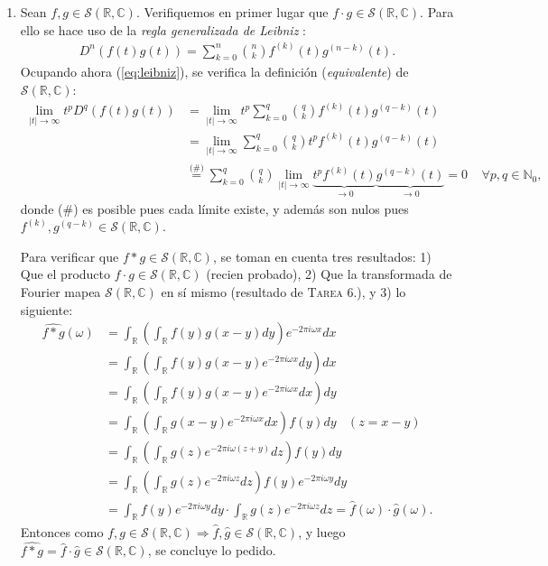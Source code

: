 \documentclass[spanish, fleqn]{article}
\begin{document}
\begin{description}
\begin{enumerate}
		\item Sean $f,g  \in \mathcal{S}(\mathbb{R},\mathbb{C})$. Verifiquemos en primer lugar que $f\cdot g \in \mathcal{S}(\mathbb{R},\mathbb{C})$. Para ello se hace uso de la \textit{regla generalizada de Leibniz} \cite{Leibniz}:
		\begin{align}
			D^n \left(f(t)g(t) \right) = \sum_{k=0}^n {n \choose k} f^{(k)}(t) g^{(n-k)}(t).
		\label{eq:leibniz}
		\end{align}
		Ocupando ahora (\ref{eq:leibniz}), se verifica la definición (\textit{equivalente}) de $\mathcal{S}(\mathbb{R},\mathbb{C})$:
		\begin{align*}
			\lim_{|t|\rightarrow \infty} t^p D^q \left( f(t)g(t) \right)
			&= \lim_{|t|\rightarrow \infty} t^p \sum_{k=0}^q {q \choose k} f^{(k)}(t) g^{(q-k)}(t) \\
			&= \lim_{|t|\rightarrow \infty} \sum_{k=0}^q {q \choose k} t^p f^{(k)}(t) g^{(q-k)}(t) \\
			&\stackrel{\text{(\#)}}{=} \sum_{k=0}^q {q \choose k}\lim_{|t|\rightarrow \infty}  \underbrace{t^p f^{(k)}(t)}_{\rightarrow 0} \underbrace{g^{(q-k)}(t)}_{\rightarrow 0} = 0 \ \ \ \ \ \forall p,q \in \mathbb{N}_0,
		\end{align*}
		donde (\#) es posible pues cada límite existe, y además son nulos pues $f^{(k)},g^{(q-k)} \in \mathcal{S}(\mathbb{R},\mathbb{C})$.

		Para verificar que $f * g \in \mathcal{S}(\mathbb{R},\mathbb{C})$, se toman en cuenta tres resultados: 1) Que el producto $f \cdot g \in \mathcal{S}(\mathbb{R},\mathbb{C})$ (recien probado), 2) Que la transformada de Fourier mapea $\mathcal{S}(\mathbb{R},\mathbb{C})$ en sí mismo (resultado de \textsc{Tarea 6.}), y 3) lo siguiente:
		\begin{align*}
			\widehat{f * g}(\omega) &= \int_{\mathbb{R}} \left( \int_{\mathbb{R}} f(y) g(x-y) dy \right) e^{-2 \pi i \omega x} dx \\
			&= \int_{\mathbb{R}} \left( \int_{\mathbb{R}} f(y) g(x-y) e^{-2 \pi i \omega x} dy \right) dx \\
			&=  \int_{\mathbb{R}} \left( \int_{\mathbb{R}} f(y) g(x-y) e^{-2 \pi i \omega x} dx \right) dy \\
			&= \int_{\mathbb{R}} \left( \int_{\mathbb{R}} g(x-y) e^{-2 \pi i \omega x} dx \right) f(y) dy \ \ \ \ (z = x-y) \\
			&= \int_{\mathbb{R}} \left( \int_{\mathbb{R}} g(z) e^{-2 \pi i \omega (z+y)} dz \right) f(y) dy \\
			&= \int_{\mathbb{R}} \left( \int_{\mathbb{R}} g(z) e^{-2 \pi i \omega z} dz \right) f(y) e^{-2 \pi i \omega y} dy \\
			&= \int_{\mathbb{R}} f(y) e^{-2 \pi i \omega y} dy \cdot \int_{\mathbb{R}} g(z) e^{-2 \pi i \omega z} dz = \widehat{f}(\omega) \cdot \widehat{g}(\omega).
		\end{align*}
		Entonces como $f,g \in  \mathcal{S}(\mathbb{R},\mathbb{C}) \Rightarrow \widehat{f},\widehat{g} \in  \mathcal{S}(\mathbb{R},\mathbb{C})$, y luego $\widehat{f * g} = \widehat{f}\cdot \widehat{g} \in  \mathcal{S}(\mathbb{R},\mathbb{C})$, se concluye lo pedido.


\end{enumerate}
\end{description}
\end{document}
